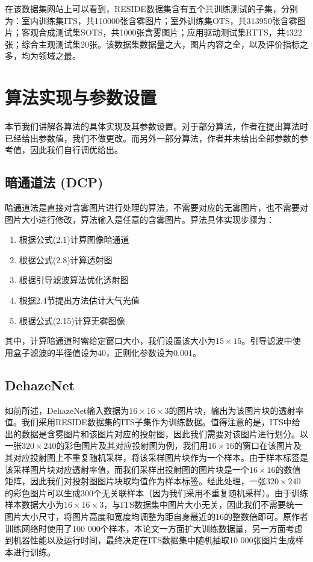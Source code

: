 \documentclass[a4paper, 12pt, oneside]{report}
\begin{document}
{在该数据集网站上可以看到，RESIDE数据集含有五个共训练测试的子集，分别为：室内训练集ITS，共110000张含雾图片；室外训练集OTS，共313950张含雾图片；客观合成测试集SOTS，共1000张含雾图片；应用驱动测试集RTTS，共4322张；综合主观测试集20张。该数据集数据量之大，图片内容之全，以及评价指标之多，均为领域之最。

\section{算法实现与参数设置\quad}
本节我们讲解各算法的具体实现及其参数设置。对于部分算法，作者在提出算法时已经给出参数值，我们不做更改。而另外一部分算法，作者并未给出全部参数的参考值，因此我们自行调优给出。

\subsection{暗通道法 (DCP)\quad}
	暗通道法是直接对含雾图片进行处理的算法，不需要对应的无雾图片，也不需要对图片大小进行修改，算法输入是任意的含雾图片。算法具体实现步骤为：
\begin{enumerate}
\item 根据公式(2.1)计算图像暗通道
\item 根据公式(2.8)计算透射图
\item 根据引导滤波算法优化透射图
\item 根据2.4节提出方法估计大气光值
\item 根据公式(2.15)计算无雾图像
\end{enumerate}

其中，计算暗通道时需给定窗口大小，我们设置该大小为$15\times 15$。引导滤波中使用盒子滤波的半径值设为40，正则化参数设为0.001。

\subsection{DehazeNet\quad}
如前所述，DehazeNet输入数据为$16 \times 16 \times 3$的图片块，输出为该图片块的透射率值。我们采用RESIDE数据集的ITS子集作为训练数据。值得注意的是，ITS中给出的数据是含雾图片和该图片对应的投射图，因此我们需要对该图片进行划分。以一张$320 \times 240$的彩色图片及其对应投射图为例，我们用$16 \times 16$的窗口在该图片及其对应投射图上不重复随机采样，将该采样图片块作为一个样本。由于样本标签是该采样图片块对应透射率值，而我们采样出投射图的图片块是一个$16 \times 16$的数值矩阵，因此我们对投射图图片块取均值作为样本标签。经此处理，一张$320 \times 240$的彩色图片可以生成300个无关联样本（因为我们采用不重复随机采样）。由于训练样本数据大小为$16 \times 16 \times 3$，与ITS数据集中图片大小无关，因此我们不需要统一图片大小尺寸，将图片高度和宽度均调整为距自身最近的16的整数倍即可。原作者训练网络时使用了100 000个样本，本论文一方面扩大训练数据量，另一方面考虑到机器性能以及运行时间，最终决定在ITS数据集中随机抽取10 000张图片生成样本进行训练。
	
}
\end{document}

